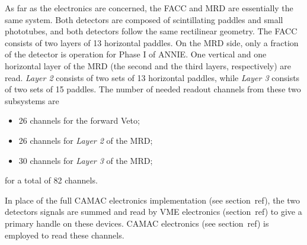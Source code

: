  As far as the electronics are concerned, the FACC and MRD are essentially the same system. 
 Both detectors are composed of scintillating paddles and small phototubes, and both detectors follow
 the same rectilinear geometry.
 The FACC consists of two layers of 13 horizontal paddles. 
 On the MRD side, only a fraction of the detector is operation for Phase I of ANNIE.
 One vertical and one horizontal layer of the MRD (the second and the third layers, respectively) %
 are read.
 \emph{Layer 2} consists of two sets of 13 horizontal paddles, while \emph{Layer 3} consists of two %
 sets of 15 paddles.
 The number of needed readout channels from these two subsystems are
 \begin{itemize}
   \item 26 channels for the forward Veto;
   \item 26 channels for \emph{Layer 2} of the MRD;
   \item 30 channels for \emph{Layer 3} of the MRD;
 \end{itemize}
 for a total of 82 channels.

 In place of the full CAMAC electronics implementation (see section~ref), the two detectors signals %
 are summed and read by VME electronics (section~ref) to give a primary handle on these devices.
 CAMAC electronics (see section~ref) is employed to read these channels.
